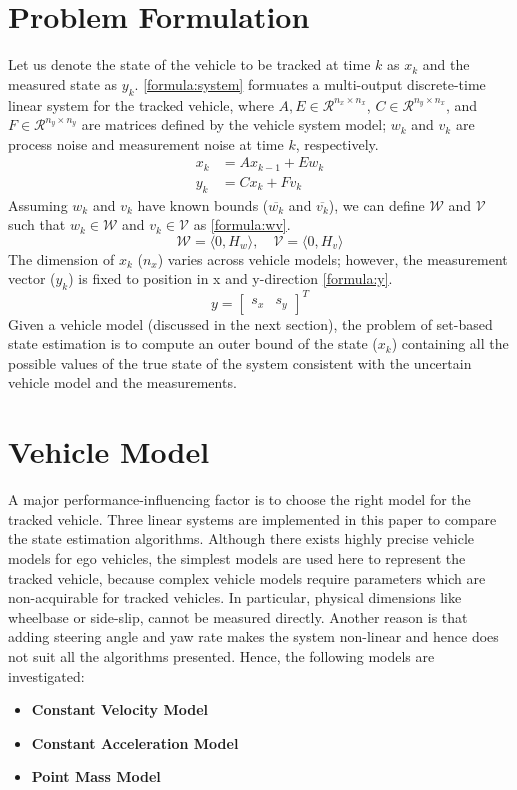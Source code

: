 \section{Problem Formulation}
Let us denote the state of the vehicle to be tracked at time $k$ as $x_k$ and the measured state as $y_k$. \eqref{formula:system} formuates a multi-output discrete-time linear system for the tracked vehicle, where $A, E \in \mathcal{R} ^{n_x \times n_x}$, $C \in \mathcal{R} ^{n_y \times n_x}$, and $F \in \mathcal{R} ^{n_y \times n_y}$ are matrices defined by the vehicle system model; $w_k$ and $v_k$ are process noise and measurement noise at time $k$, respectively. 
\begin{equation}
\label{formula:system}
\begin{split}
x_{k} &= Ax_{k-1} + Ew_k\\
y_k &= Cx_k + Fv_k
\end{split}
\end{equation}
Assuming $w_k$ and $v_k$ have known bounds ($\overline{w_k}$ and $\overline{v_k}$), we can define $\mathcal{W}$ and $\mathcal{V}$ such that $w_k \in \mathcal{W}$ and $v_k \in \mathcal{V}$ as \eqref{formula:wv}.
\begin{equation}
\label{formula:wv}
\mathcal{W} = \langle 0, H_w \rangle ,\quad \mathcal{V} = \langle 0, H_v \rangle
\end{equation}
The dimension of $x_k$ ($n_x$) varies across vehicle models; however, the measurement vector ($y_k$) is fixed to position in x and y-direction \eqref{formula:y}.  
\begin{equation}
\label{formula:y}
y =[ 
\begin{matrix}
s_x & s_y
\end{matrix}
]^T
\end{equation}
Given a vehicle model (discussed in the next section), the problem of set-based state estimation is to compute an outer bound of the state ($x_k$) containing all the possible values of the true state of the system consistent with the uncertain vehicle model and the measurements.
\section{Vehicle Model}
A major performance-influencing factor is to choose the right model for the tracked vehicle. Three linear systems are implemented in this paper to compare the state estimation algorithms. Although there exists highly precise vehicle models for ego vehicles, the simplest models are used here to represent the tracked vehicle, because complex vehicle models require parameters which are non-acquirable for tracked vehicles. In particular, physical dimensions like wheelbase or side-slip, cannot be measured directly. Another reason is that adding steering angle and yaw rate makes the system non-linear and hence does not suit all the algorithms presented. Hence, the following models are investigated:
\begin{itemize}
\item \textbf{Constant Velocity Model}
\item \textbf{Constant Acceleration Model}
\item \textbf{Point Mass Model}
\end{itemize}
